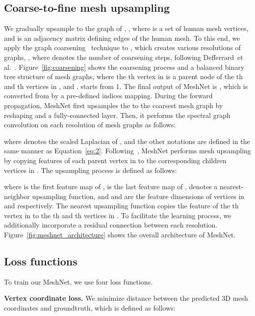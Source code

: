 \documentclass[runningheads]{llncs}
\begin{document}
\vspace{-2mm}
\subsection{Coarse-to-fine mesh upsampling}
We gradually upsample  to the graph of ,
, where  is a set of  human mesh vertices, and  is an adjacency matrix defining edges of the human mesh.
To this end, we apply the graph coarsening~\cite{dhillon2007graculus} technique to , which creates various resolutions of graphs, , where  denotes the number of coarsening steps, following Defferrard~et al.~\cite{defferrard2016chebygcn}.
Figure~\ref{fig:coarsening} shows the coarsening process and a balanced binary tree structure of mesh graphs, where the th vertex in  is a parent node of the th and th vertices in , and  . 
 starts from 1.
The final output of MeshNet is , which is converted from   by a pre-defined indices mapping.
During the forward propagation, MeshNet first upsamples the  to the coarsest mesh graph  by reshaping and a fully-connected layer.
Then, it performs the spectral graph convolution on each resolution of mesh graphs as follows:

where  denotes the scaled Laplacian of , and the other notations are defined in the same manner as Equation~\ref{eq:2}. 
Following~\cite{ge2019handgcn}, MeshNet performs mesh upsampling by copying features of each parent vertex in  to the corresponding children vertices in .
The upsampling process is defined as follows:

where  is the first feature map of ,  is the last feature map of ,  denotes a nearest-neighbor upsampling function, and  and are the feature dimensions of vertices in  and  respectively.
The nearest upsampling function copies the feature of the th vertex in  to the th and th vertices in  .
To facilitate the learning process, we additionally incorporate a residual connection between each resolution.
Figure~\ref{fig:meshnet_architecture} shows the overall architecture of MeshNet.

\vspace{-2mm}
\subsection{Loss functions}
To train our MeshNet, we use four loss functions.

\noindent\textbf{Vertex coordinate loss.}
We minimize  distance between the predicted 3D mesh coordinates  and groundtruth, which is defined as follows:
\end{document}

